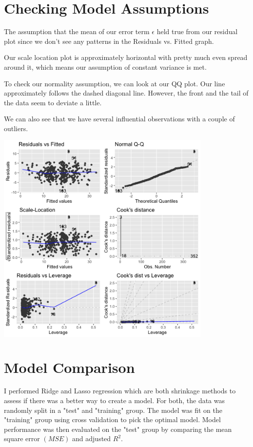 \documentclass{article}
\begin{document}
\section{Checking Model Assumptions}

The assumption that the mean of our error term $\epsilon$ held true from our residual plot since we don't see any patterns in the Residuals vs. Fitted graph.

Our scale location plot is approximately horizontal with pretty much even spread around it, which means our assumption of constant variance is met. 

To check our normality assumption, we can look at our QQ plot. Our line approximately follows the dashed diagonal line. However, the front and the tail of the data seem to deviate a little. 

We can also see that we have several influential observations with a couple of outliers. 

\includegraphics[width=0.8\textwidth]{Figures/model_assumptions.png}\\


\section{Model Comparison}

I performed Ridge and Lasso regression which are both shrinkage methods to assess if there was a better way to create a model. For both, the data was randomly split in a "test" and "training" group. The model was fit on the "training" group using cross validation to pick the optimal model. Model performance was then evaluated on the "test" group by comparing the mean square error $(MSE)$ and adjusted $R^2$.
\end{document}
